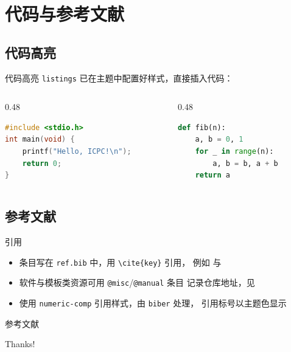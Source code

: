 \documentclass[aspectratio=169]{beamer}
\begin{document}
\section{代码与参考文献}

\subsection{代码高亮}

\begin{frame}[fragile]{代码高亮}
    \texttt{listings} 已在主题中配置好样式，直接插入代码：
    \begin{columns}
        \begin{column}{0.48\textwidth}
            \begin{lstlisting}[language=C]
#include <stdio.h>
int main(void) {
    printf("Hello, ICPC!\n");
    return 0;
}
\end{lstlisting}
        \end{column}
        \begin{column}{0.48\textwidth}
            \begin{lstlisting}[language=Python]
def fib(n):
    a, b = 0, 1
    for _ in range(n):
        a, b = b, a + b
    return a
\end{lstlisting}
        \end{column}
    \end{columns}
\end{frame}

\subsection{参考文献}

\begin{frame}{引用}
    \begin{itemize}
        \item 条目写在 \texttt{ref.bib} 中，用
              \texttt{\textbackslash cite\{key\}} 引用，
              例如 \cite{texbook} 与 \cite{beamerug}
        \item 软件与模板类资源可用 \texttt{@misc}/\texttt{@manual} 条目
              记录仓库地址，见 \cite{thu,pku,origin,sdu}
        \item 使用 \texttt{numeric-comp} 引用样式，由 \texttt{biber} 处理，
              引用标号以主题色显示
    \end{itemize}
\end{frame}

\begin{frame}[allowframebreaks]{参考文献}
    \printbibliography
\end{frame}

\begin{frame}
    \begin{center}
        {\Huge\calligra Thanks!}
    \end{center}
\end{frame}
\end{document}
